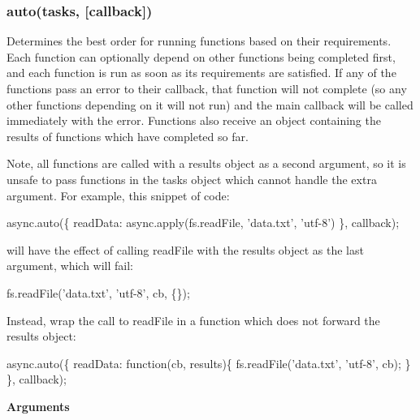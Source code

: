 \label{_auto}%
 \subsubsection*{auto(tasks, \mbox{[}callback\mbox{]})}

Determines the best order for running functions based on their requirements. Each function can optionally depend on other functions being completed first, and each function is run as soon as its requirements are satisfied. If any of the functions pass an error to their callback, that function will not complete (so any other functions depending on it will not run) and the main callback will be called immediately with the error. Functions also receive an object containing the results of functions which have completed so far.

Note, all functions are called with a results object as a second argument, so it is unsafe to pass functions in the tasks object which cannot handle the extra argument. For example, this snippet of code\+:


\begin{DoxyCode}
async.auto(\{
  readData: async.apply(fs.readFile, \textcolor{stringliteral}{'data.txt'}, \textcolor{stringliteral}{'utf-8'})
\}, callback);
\end{DoxyCode}


will have the effect of calling read\+File with the results object as the last argument, which will fail\+:


\begin{DoxyCode}
fs.readFile(\textcolor{stringliteral}{'data.txt'}, \textcolor{stringliteral}{'utf-8'}, cb, \{\});
\end{DoxyCode}


Instead, wrap the call to read\+File in a function which does not forward the results object\+:


\begin{DoxyCode}
async.auto(\{
  readData: \textcolor{keyword}{function}(cb, results)\{
    fs.readFile(\textcolor{stringliteral}{'data.txt'}, \textcolor{stringliteral}{'utf-8'}, cb);
  \}
\}, callback);
\end{DoxyCode}


{\bfseries Arguments}


